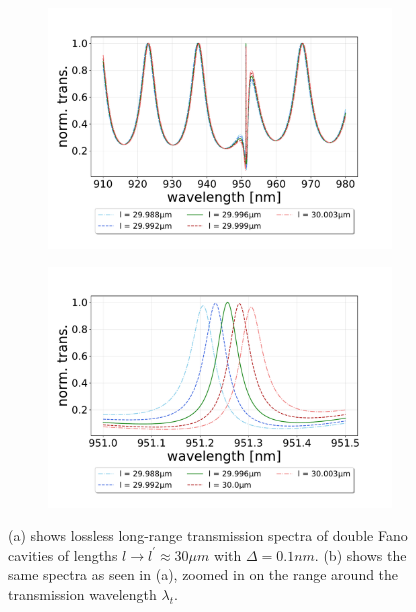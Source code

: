 \begin{figure}[h!]
    \centering
    \begin{subfigure}[b]{0.49\textwidth}
        \includegraphics[width=\textwidth]{figures/small_detuning_length_scan_long.pdf}
        \caption{}
        \label{fig:detuned_small_length_scan_long}
    \end{subfigure}
    \begin{subfigure}[b]{0.49\textwidth}
        \includegraphics[width=\textwidth]{figures/small_detuning_length_scan_short.pdf}
        \caption{}
        \label{fig:detuned_small_length_scan_short}
    \end{subfigure}
    \caption{(a) shows lossless long-range transmission spectra of double Fano cavities of lengths $l \rightarrow l^{\prime} \approx 30 \mu m$ with $\Delta = 0.1nm$. (b) shows the same spectra as seen in (a), zoomed in on the range around the transmission wavelength $\lambda_t$.}
    \label{fig:small_detuning_length_scans}
\end{figure}

